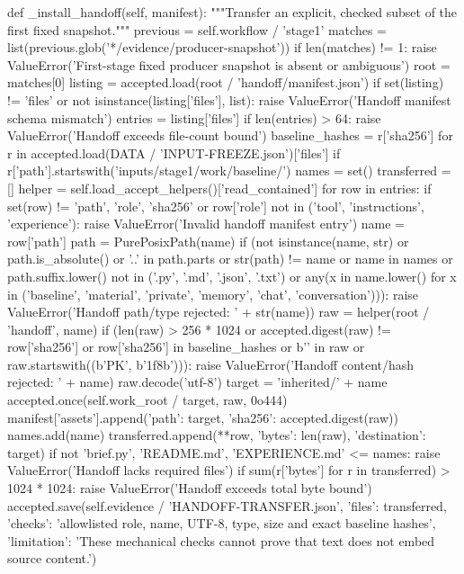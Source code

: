     def _install_handoff(self, manifest):
        """Transfer an explicit, checked subset of the first fixed snapshot."""
        previous = self.workflow / 'stage1'
        matches = list(previous.glob('*/evidence/producer-snapshot'))
        if len(matches) != 1:
            raise ValueError('First-stage fixed producer snapshot is absent or ambiguous')
        root = matches[0]
        listing = accepted.load(root / 'handoff/manifest.json')
        if set(listing) != {'files'} or not isinstance(listing['files'], list):
            raise ValueError('Handoff manifest schema mismatch')
        entries = listing['files']
        if len(entries) > 64:
            raise ValueError('Handoff exceeds file-count bound')
        baseline_hashes = {r['sha256'] for r in accepted.load(DATA / 'INPUT-FREEZE.json')['files']
                           if r['path'].startswith('inputs/stage1/work/baseline/')}
        names = set()
        transferred = []
        helper = self.load_accept_helpers()['read_contained']
        for row in entries:
            if set(row) != {'path', 'role', 'sha256'} or row['role'] not in ('tool', 'instructions', 'experience'):
                raise ValueError('Invalid handoff manifest entry')
            name = row['path']
            path = PurePosixPath(name)
            if (not isinstance(name, str) or path.is_absolute() or '..' in path.parts or str(path) != name
                or name in names or path.suffix.lower() not in ('.py', '.md', '.json', '.txt')
                or any(x in name.lower() for x in ('baseline', 'material', 'private', 'memory', 'chat', 'conversation'))):
                raise ValueError('Handoff path/type rejected: ' + str(name))
            raw = helper(root / 'handoff', name)
            if (len(raw) > 256 * 1024 or accepted.digest(raw) != row['sha256'] or row['sha256'] in baseline_hashes
                or b'' in raw or raw.startswith((b'PK', b'\x1f\x8b'))):
                raise ValueError('Handoff content/hash rejected: ' + name)
            raw.decode('utf-8')
            target = 'inherited/' + name
            accepted.once(self.work_root / target, raw, 0o444)
            manifest['assets'].append({'path': target, 'sha256': accepted.digest(raw)})
            names.add(name)
            transferred.append({**row, 'bytes': len(raw), 'destination': target})
        if not {'brief.py', 'README.md', 'EXPERIENCE.md'} <= names:
            raise ValueError('Handoff lacks required files')
        if sum(r['bytes'] for r in transferred) > 1024 * 1024:
            raise ValueError('Handoff exceeds total byte bound')
        accepted.save(self.evidence / 'HANDOFF-TRANSFER.json', {'files': transferred,
            'checks': 'allowlisted role, name, UTF-8, type, size and exact baseline hashes',
            'limitation': 'These mechanical checks cannot prove that text does not embed source content.'})

